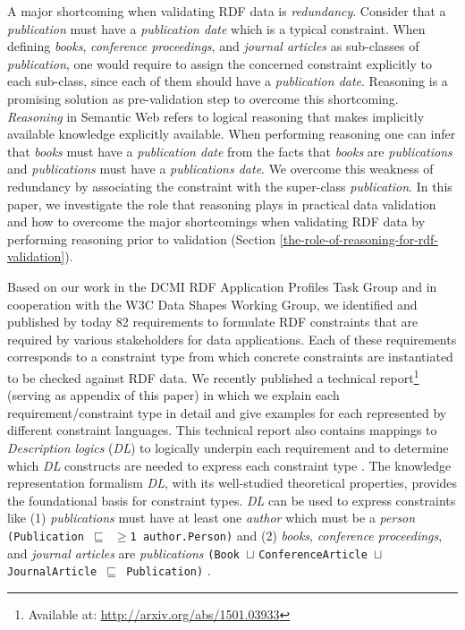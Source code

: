 \documentclass{acm_proc_article-sp}
\newcommand{\ms}[1]{%
  \texttt{#1}
}
\begin{document}
A major shortcoming when validating RDF data is \emph{redundancy}.
Consider that a \emph{publication} must have a \emph{publication date} which is a typical constraint.
When defining \emph{books}, \emph{conference proceedings}, and \emph{journal articles} as sub-classes of \emph{publication}, 
one would require to assign the concerned constraint explicitly to each sub-class, 
since each of them should have a \emph{publication date}.
Reasoning is a promising solution as pre-validation step to overcome this shortcoming. 
\emph{Reasoning} in Semantic Web refers to logical reasoning that  makes implicitly available knowledge explicitly available.
When performing reasoning one can infer that \emph{books} must have a \emph{publication date} 
from the facts that \emph{books} are \emph{publications} and \emph{publications} must have a \emph{publications date}.  
We overcome this weakness of redundancy by associating the constraint with the super-class \emph{publication}.
In this paper, we investigate the role that reasoning plays in practical data validation and 
how to overcome the major shortcomings when validating RDF data by performing reasoning prior to validation (Section \ref{the-role-of-reasoning-for-rdf-validation}).

Based on our work in the DCMI RDF Application Profiles Task Group and in cooperation with the W3C Data Shapes Working Group, 
we identified and published by today 82 requirements to formulate RDF constraints that are required by various stakeholders for data applications.
Each of these requirements corresponds to a constraint type from which concrete constraints are instantiated to be checked against RDF data.
We recently published a technical report\footnote{Available at: \url{http://arxiv.org/abs/1501.03933}} (serving as appendix of this paper) 
in which we explain each requirement/constraint type in detail and give examples for each represented by different constraint languages.
This technical report also contains mappings to {\em Description logics} (\emph{DL}) to logically underpin each requirement and to determine which \emph{DL} constructs are needed to express each constraint type \cite{BoschNolleAcarEckert2015}.
The knowledge representation formalism \emph{DL}, with its well-studied theoretical properties, 
provides the foundational basis for constraint types. 
\emph{DL} can be used to express constraints like (1) \emph{publications} must have at least one \emph{author} which must be a \emph{person} {\small\ms{(Publication $\sqsubseteq$ $\geq$1 author.Person)}} and
(2) \emph{books}, \emph{conference proceedings}, and \emph{journal articles} are \emph{publications} {\small\ms{(Book $\sqcup$} \ms{ConferenceArticle $\sqcup$} \ms{JournalArticle $\sqsubseteq$ Publication)}}. 
\end{document}
